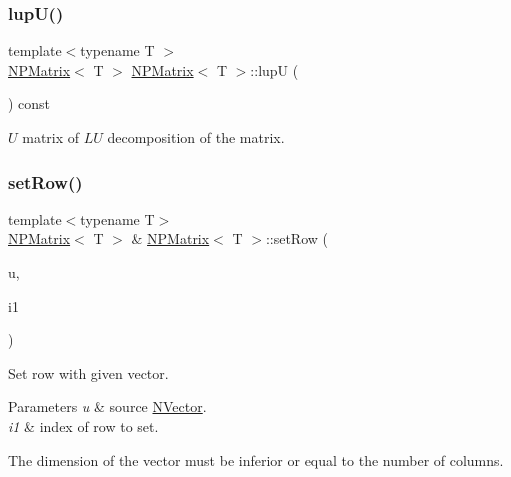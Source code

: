 \subsubsection{\texorpdfstring{lupU()}{lupU()}}
{\footnotesize\ttfamily template$<$typename T $>$ \\
\mbox{\hyperlink{class_n_p_matrix}{N\+P\+Matrix}}$<$ T $>$ \mbox{\hyperlink{class_n_p_matrix}{N\+P\+Matrix}}$<$ T $>$\+::lupU (\begin{DoxyParamCaption}{ }\end{DoxyParamCaption}) const}



$ U $ matrix of $ LU $ decomposition of the matrix. 

\mbox{\label{class_n_p_matrix_aac65ad5cc7a3a73b8eddbd8501957ca6}} 
\subsubsection{\texorpdfstring{setRow()}{setRow()}}
{\footnotesize\ttfamily template$<$typename T$>$ \\
\mbox{\hyperlink{class_n_p_matrix}{N\+P\+Matrix}}$<$ T $>$ \& \mbox{\hyperlink{class_n_p_matrix}{N\+P\+Matrix}}$<$ T $>$\+::set\+Row (\begin{DoxyParamCaption}\item[{const \mbox{\hyperlink{class_n_vector}{N\+Vector}}$<$ T $>$ \&}]{u,  }\item[{\mbox{\hyperlink{group___n_algebra_ga1b140a2034db3f5dfe18a987745df43a}{ul\+\_\+t}}}]{i1 }\end{DoxyParamCaption})}



Set row with given vector. 


\begin{DoxyParams}{Parameters}
{\em u} & source {\ttfamily \mbox{\hyperlink{class_n_vector}{N\+Vector}}}. \\
\hline
{\em i1} & index of row to set.\\
\hline
\end{DoxyParams}
The dimension of the vector must be inferior or equal to the number of columns. \mbox{\label{class_n_p_matrix_ac950c160738743255b84702fca1e521d}} 
